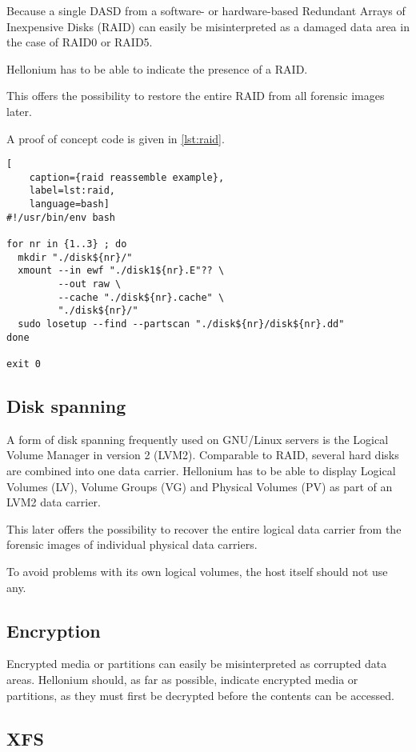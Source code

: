Because a single DASD from a software- or hardware-based Redundant Arrays of Inexpensive Disks (RAID) can easily be misinterpreted as a damaged data area in the case of RAID0 or RAID5. \cite{Patterson1988}

Hellonium has to be able to indicate the presence of a RAID.

This offers the possibility to restore the entire RAID from all forensic images later.

A proof of concept code is given in \cref{lst:raid}.

\begin{lstlisting}[
    caption={raid reassemble example},
    label=lst:raid,
    language=bash]
#!/usr/bin/env bash

for nr in {1..3} ; do
  mkdir "./disk${nr}/"
  xmount --in ewf "./disk1${nr}.E"?? \
         --out raw \
         --cache "./disk${nr}.cache" \
         "./disk${nr}/"
  sudo losetup --find --partscan "./disk${nr}/disk${nr}.dd"
done

exit 0
\end{lstlisting}

\subsection{Disk spanning}

A form of disk spanning frequently used on GNU/Linux servers is the Logical Volume Manager in version 2 (LVM2). Comparable to RAID, several hard disks are combined into one data carrier. Hellonium has to be able to display Logical Volumes (LV), Volume Groups (VG) and Physical Volumes (PV) as part of an LVM2 data carrier.

This later offers the possibility to recover the entire logical data carrier from the forensic images of individual physical data carriers.

To avoid problems with its own logical volumes, the host itself should not use any.

\subsection{Encryption}

Encrypted media or partitions can easily be misinterpreted as corrupted data areas. Hellonium should, as far as possible, indicate encrypted media or partitions, as they must first be decrypted before the contents can be accessed.

\subsection{XFS}

